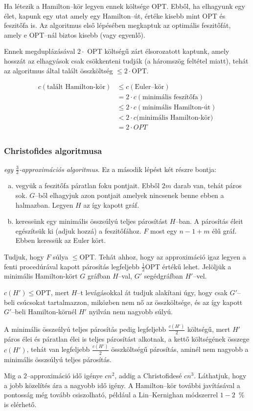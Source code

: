 Ha létezik a Hamilton--kör legyen ennek költsége OPT. Ebből, ha elhagyunk egy
élet, kapunk egy utat amely egy Hamilton--út, értéke kisebb mint OPT és
feszitőfa is. Az algoritmus első lépésében megkaptuk az optimális feszitőfát,
amely e OPT--nál biztos kisebb (vagy egyenlő).

Ennek megduplázásával $2 \cdot$ OPT költségű zárt élsorozatott kaptunk, amely
hosszát az elhagyások csak csökkenteni tudják (a háromszög feltétel miatt),
tehát az algoritmus által talált összköltség $\leq 2 \cdot$OPT.

\begin{align*}
 c(\mbox{talált Hamilton-kör}) &\leq c(\mbox{Euler--kör})		         \\ 
 						       &= 2  \cdot c(\mbox{minimális feszítőfa})       \\
 							   & \leq 2 \cdot c(\mbox{minimális Hamilton-út}) \\ 
 							   & < 2\cdot c(\mbox{minimális Hamilton-kör)}    \\ 
 							   & = 2\cdot OPT 								  \\
\end{align*}

\subsubsection{Christofides algoritmusa}

\emph{egy $\frac{3}{2}$-approximációs algoritmus}. Ez a második lépést két részre bontja:

\begin{enumerate}[(a)]
\item vegyük a feszitőfa páratlan foku pontjait. Ebből $2m$ darab van, tehát
páros sok. $G$--ből elhagyjuk azon pontjait amelyek nincsenek benne ebben a
halmazban. Legyen $H$ az így kapott gráf.
\item keressünk egy minimális összsúlyú teljes párosítást $H$--ban. A párosítás
éleit egészítsük ki (adjuk hozzá) a feszitőfához. $F$ most egy $n-1+m$ élű gráf.
Ebben keressük az Euler kört.
\end{enumerate}

Tudjuk, hogy $F$ súlya $\leq$OPT. Tehát ahhoz, hogy az approximáció igaz legyen
a fenti procedúrával kapott párosítás legfeljebb $\frac{1}{2}$OPT értékű lehet.
Jelöljük a minimális Hamilton-kört $G$ gráfban $H$--val, $G'$ segédgráfban
$H'$--vel. 

$c(H') \leq$OPT, mert $H$--t levágásokkal át tudjuk alakítani úgy, hogy csak
$G'$--beli csúcsokat tartalmazzon, miközben nem nő az összköltsége, és az így
kapott $G'$--beli Hamilton-körnél $H'$ nyilván nem nagyobb súlyú.

A minimális összsúlyú teljes párosítás pedig legfeljebb $\frac{c(H')}{2}$
költségű, mert $H'$ páros élei és páratlan élei is teljes párosítást alkotnak, a
kettő költségének összege $c(H')$, tehát van legfeljebb $\frac{c(H')}{2}$
összköltségű párosítás, aminél nem nagyobb a minimális összsúlyú teljes
párosítás.

Mig a $2$--approximáció idő igénye $cn^2$, addig a Christofidesé $cn^3$.
Láthatjuk, hogy a jobb közelítés ára a nagyobb idő igény. A Hamilton--kör
további javításával a pontosság még tovább csiszolható, például a Lin--Kernighan
módszerrel $1-2$~\% is elérhető. 
